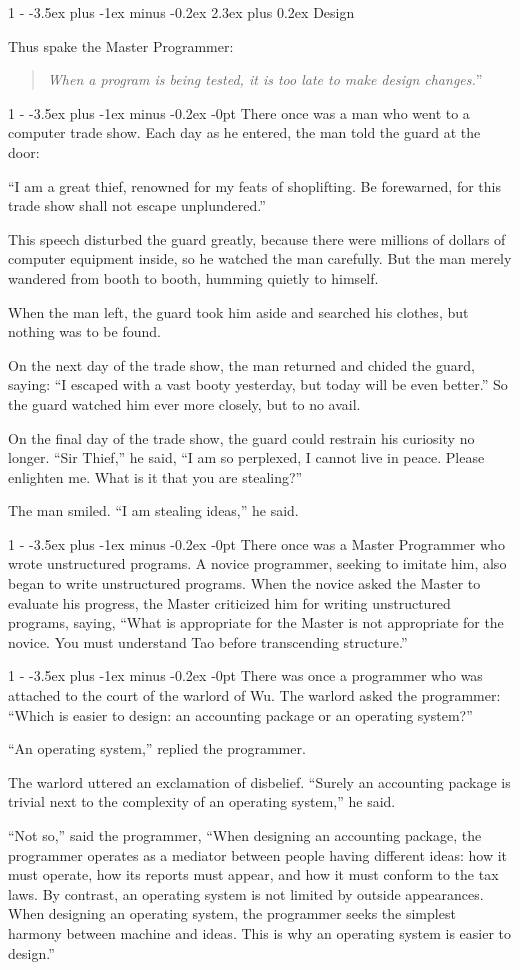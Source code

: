 \documentclass[12pt,letterpaper]{article}
\makeatletter
\newlength{\intomargin}\setlength{\intomargin}{25pt}
\renewcommand{\section}{%
\@startsection{section}%
{1}%
{-\intomargin}%
{-3.5ex plus -1ex minus -0.2ex}%
{2.3ex plus 0.2ex}%
{\normalfont\Large\bfseries}%
}
\renewcommand{\subsection}{%
\@startsection{subsection}%
{1}%
{-\intomargin}%
{-3.5ex plus -1ex minus -0.2ex}%
{-0pt}%
{\normalfont\large\bfseries}%
}
\newcommand{\book}[2]{\section{#1}\par\hspace{-\intomargin}Thus spake the Master Programmer:%
\begin{quotation}\noindent\llap{``}\textsl{#2}''\end{quotation}\medskip}
\newcommand{\sect}{\subsection{}}
\makeatother
\begin{document}
\book{Design}%
{When a program is being tested, it is too late to make design changes.}

\sect
There once was a man who went to a computer trade show. Each day as he
entered, the man told the guard at the door:

``I am a great thief, renowned for my feats of shoplifting. Be
forewarned, for this trade show shall not escape unplundered.''

This speech disturbed the guard greatly, because there were millions
of dollars of computer equipment inside, so he watched the man
carefully. But the man merely wandered from booth to booth, humming
quietly to himself.

When the man left, the guard took him aside and searched his clothes,
but nothing was to be found.

On the next day of the trade show, the man returned and chided the
guard, saying: ``I escaped with a vast booty yesterday, but today will
be even better.'' So the guard watched him ever more closely, but to
no avail.

On the final day of the trade show, the guard could restrain his
curiosity no longer. ``Sir Thief,'' he said, ``I am so perplexed, I
cannot live in peace. Please enlighten me. What is it that you are
stealing?''

The man smiled. ``I am stealing ideas,'' he said.

\sect
There once was a Master Programmer who wrote unstructured programs. A
novice programmer, seeking to imitate him, also began to write
unstructured programs. When the novice asked the Master to evaluate
his progress, the Master criticized him for writing unstructured
programs, saying, ``What is appropriate for the Master is not
appropriate for the novice. You must understand Tao before
transcending structure.''

\sect
There was once a programmer who was attached to the court of the
warlord of Wu. The warlord asked the programmer: ``Which is easier to
design: an accounting package or an operating system?''

``An operating system,'' replied the programmer.

The warlord uttered an exclamation of disbelief. ``Surely an
accounting package is trivial next to the complexity of an operating
system,'' he said.

``Not so,'' said the programmer, ``When designing an accounting
package, the programmer operates as a mediator between people having
different ideas: how it must operate, how its reports must appear, and
how it must conform to the tax laws. By contrast, an operating system
is not limited by outside appearances. When designing an operating
system, the programmer seeks the simplest harmony between machine and
ideas. This is why an operating system is easier to design.''
\end{document}
